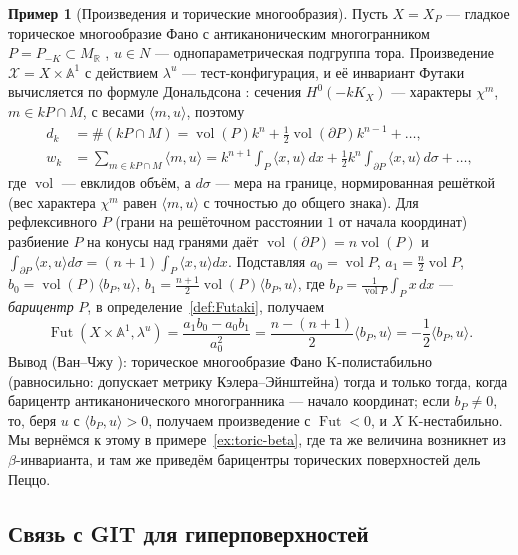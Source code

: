 \documentclass[11pt,a4paper]{article}
\theoremstyle{plain}
\theoremstyle{definition}
\newtheorem{example}[theorem]{Пример}
\theoremstyle{remark}
\newcommand{\R}{\mathbb{R}}
\newcommand{\A}{\mathbb{A}}
\newcommand{\cX}{\mathcal{X}}
\DeclareMathOperator{\vol}{vol}
\DeclareMathOperator{\Fut}{Fut}
\begin{document}
\begin{example}[Произведения и торические многообразия]\label{ex:toric-product-tc}
Пусть $X=X_P$ --- гладкое торическое многообразие Фано с антиканоническим многогранником
$P=P_{-K}\subset M_\R$ \cite[\S\,4.3]{CLS}, $u\in N$ --- однопараметрическая подгруппа тора. Произведение
$\cX=X\times\A^1$ с действием $\lambda^u$ --- тест-конфигурация, и её инвариант Футаки
вычисляется по формуле Дональдсона \cite{Don02}: сечения $H^0(-kK_X)$ --- характеры $\chi^m$,
$m\in kP\cap M$, с весами $\langle m,u\rangle$, поэтому
\begin{align*}
d_k&=\#(kP\cap M)=\vol(P)k^n+\tfrac12\vol(\partial P)k^{n-1}+\dots,\\
w_k&=\sum_{m\in kP\cap M}\langle m,u\rangle=k^{n+1}\int_P\langle x,u\rangle\,dx+\tfrac12k^n\int_{\partial P}\langle x,u\rangle\,d\sigma+\dots,
\end{align*}
где $\vol$ --- евклидов объём, а $d\sigma$ --- мера на границе, нормированная решёткой (вес
характера $\chi^m$ равен $\langle m,u\rangle$ с точностью до общего знака). Для рефлексивного $P$
(грани на решёточном расстоянии $1$ от начала координат) разбиение $P$ на конусы над гранями даёт
$\vol(\partial P)=n\vol(P)$ и $\int_{\partial P}\langle x,u\rangle d\sigma=(n+1)\int_P\langle x,u\rangle dx$.
Подставляя $a_0=\vol P$, $a_1=\frac n2\vol P$, $b_0=\vol(P)\langle b_P,u\rangle$,
$b_1=\frac{n+1}2\vol(P)\langle b_P,u\rangle$, где $b_P=\frac1{\vol P}\int_Px\,dx$ ---
\emph{барицентр} $P$, в определение~\ref{def:Futaki}, получаем
\[
\Fut(X\times\A^1,\lambda^u)=\frac{a_1b_0-a_0b_1}{a_0^2}=\frac{n-(n+1)}2\langle b_P,u\rangle=-\frac12\langle b_P,u\rangle .
\]
Вывод (Ван--Чжу \cite{WZ}): торическое многообразие Фано K-полистабильно (равносильно: допускает
метрику Кэлера--Эйнштейна) тогда и только тогда, когда барицентр антиканонического многогранника --- начало
координат; если $b_P\ne0$, то, беря $u$ с $\langle b_P,u\rangle>0$, получаем произведение с
$\Fut<0$, и $X$ K-нестабильно. Мы вернёмся к этому в примере~\ref{ex:toric-beta}, где та же величина
возникнет из $\beta$-инварианта, и там же приведём барицентры торических поверхностей дель Пеццо.
\end{example}

\subsection{Связь с GIT для гиперповерхностей}
\end{document}
